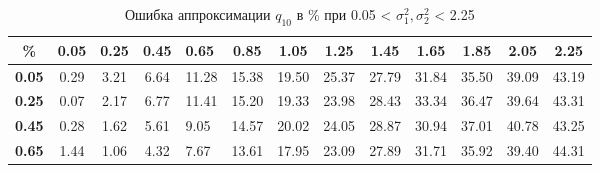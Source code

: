 \documentclass[12pt]{article}
\begin{document}
\begin{table}[]
	\caption{Ошибка аппроксимации $q_{10}$ в \% при 0.05 < $\sigma_{1}^{2}, \sigma_{2}^{2}$ < 2.25 }
	\begin{tabular}{|c|ccclcccccccc}
		\hline
		\textbf{\%}                         & \multicolumn{1}{c|}{\textbf{0.05}} & \multicolumn{1}{c|}{\textbf{0.25}} & \multicolumn{1}{c|}{\textbf{0.45}} & \multicolumn{1}{l|}{\textbf{0.65}} & \multicolumn{1}{c|}{\textbf{0.85}} & \multicolumn{1}{c|}{\textbf{1.05}} & \multicolumn{1}{c|}{\textbf{1.25}} & \multicolumn{1}{c|}{\textbf{1.45}} & \multicolumn{1}{c|}{\textbf{1.65}} & \multicolumn{1}{c|}{\textbf{1.85}} & \multicolumn{1}{c|}{\textbf{2.05}} & \multicolumn{1}{c|}{\textbf{2.25}} \\ \hline
		\textbf{0.05}                       & 0.29                               & 3.21                               & 6.64                               & \multicolumn{1}{c}{11.28}          & 15.38                              & 19.50                              & 25.37                              & 27.79                              & 31.84                              & 35.50                              & 39.09                              & 43.19                              \\ \cline{1-1}
		\textbf{0.25}                       & 0.07                               & 2.17                               & 6.77                               & 11.41                              & 15.20                              & 19.33                              & 23.98                              & 28.43                              & 33.34                              & 36.47                              & 39.64                              & 43.31                              \\ \cline{1-1}
		\textbf{0.45}                       & 0.28                               & 1.62                               & 5.61                               & 9.05                               & 14.57                              & 20.02                              & 24.05                              & 28.87                              & 30.94                              & 37.01                              & 40.78                              & 43.25                              \\ \cline{1-1}
		\textbf{0.65}                       & 1.44                               & 1.06                               & 4.32                               & 7.67                               & 13.61                              & 17.95                              & 23.09                              & 27.89                              & 31.71                              & 35.92                              & 39.40                              & 44.31                              \\ \cline{1-1}

\end{tabular}
\end{table}
\end{document}
